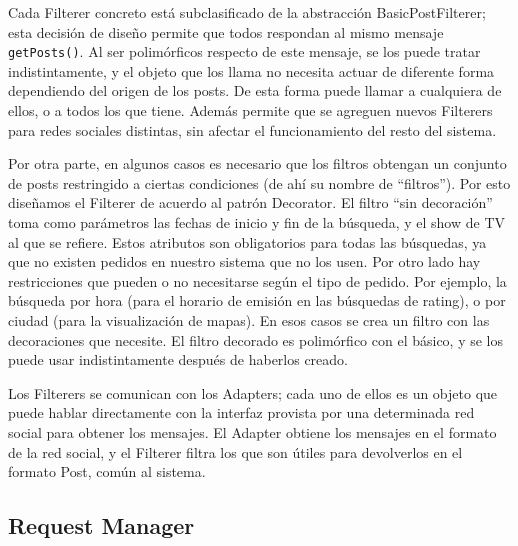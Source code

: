 Cada Filterer concreto está subclasificado de la abstracción BasicPostFilterer; esta decisión de diseño permite que todos respondan al mismo mensaje \texttt{getPosts()}. Al ser polimórficos respecto de este mensaje, se los puede tratar indistintamente, y el objeto que los llama no necesita actuar de diferente forma dependiendo del origen de los posts. De esta forma puede llamar a cualquiera de ellos, o a todos los que tiene. Además permite que se agreguen nuevos Filterers para redes sociales distintas, sin afectar el funcionamiento del resto del sistema.
\bigskip

Por otra parte, en algunos casos es necesario que los filtros obtengan un conjunto de posts restringido a ciertas condiciones (de ahí su nombre de ``filtros''). Por esto diseñamos el Filterer de acuerdo al patrón Decorator. El filtro ``sin decoración'' toma como parámetros las fechas de inicio y fin de la búsqueda, y el show de TV al que se refiere. Estos atributos son obligatorios para todas las búsquedas, ya que no existen pedidos en nuestro sistema que no los usen. Por otro lado hay restricciones que pueden o no necesitarse según el tipo de pedido. Por ejemplo, la búsqueda por hora (para el horario de emisión en las búsquedas de rating), o por ciudad (para la visualización de mapas). En esos casos se crea un filtro con las decoraciones que necesite. El filtro decorado es polimórfico con el básico, y se los puede usar indistintamente después de haberlos creado.
\bigskip

Los Filterers se comunican con los Adapters; cada uno de ellos es un objeto que puede hablar directamente con la interfaz provista por una determinada red social para obtener los mensajes. El Adapter obtiene los mensajes en el formato de la red social, y el Filterer filtra los que son útiles para devolverlos en el formato Post, común al sistema.

\subsection{Request Manager}

